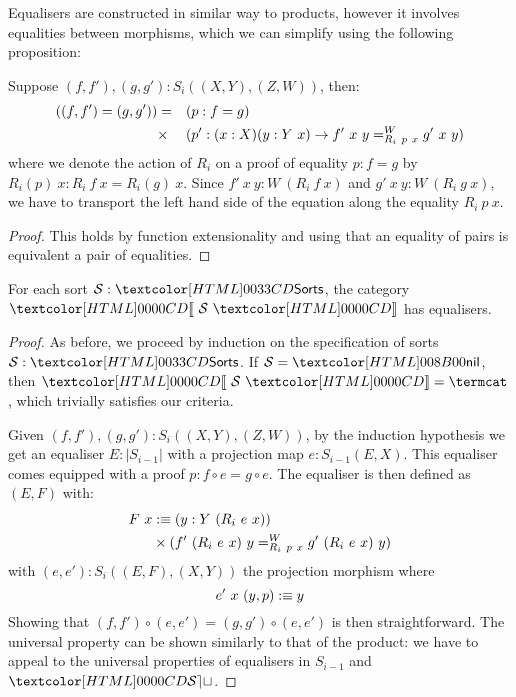 Equalisers are constructed in similar way to products, however it
involves equalities between morphisms, which we can simplify using the
following proposition:

\begin{proposition}
  Suppose $(f,f'), (g,g') : S_i((X,Y),(Z,W))$, then:
  \begin{align*}
    ((f,f') = (g,g')) &=& &(p : f = g) \\
                      &\times& &(p' : (x : X) (y : Y\ x) \to \pathover{W}{R_i\ p\ x}{f'\ x\ y}{g'\ x\ y})
  \end{align*}
  where we denote the action of $R_i$ on a proof of equality
  $p : f = g$ by $R_i(p)\ x : R_i\ f\ x = R_i(g)\ x$. Since
  $f'\ x\ y : W\ (R_i\ f\ x)$ and $g'\ x\ y : W\ (R_i\ g\ x)$, we have
  to transport the left hand side of the equation along the equality
  $R_i\ p\ x$.
\end{proposition}

\begin{proof}
  This holds by function extensionality and using that an equality of
  pairs is equivalent a pair of equalities.
\end{proof}
\begin{lemma}
\label{sorts-equalisers}
  For each sort $\Ss : \sortsty$, the category $\SortCat{\Ss}$ has
  equalisers.
\end{lemma}

\begin{proof}
  As before, we proceed by induction on the specification of sorts
  $\Ss : \sortsty$.  If $\Ss = \sortsnil$, then $\SortCat{\Ss} = \termcat$,
  which trivially satisfies our criteria.



  Given $(f,f'), (g,g') : S_i((X,Y),(Z,W))$, by the induction
  hypothesis we get an equaliser $E : |S_{i-1}|$ with a projection map
  $e : S_{i-1}(E,X)$. This equaliser comes equipped with a proof
  $p : f \circ e = g \circ e$. The equaliser is then defined as
  $(E,F)$ with:
  \begin{align*}
    F\ x & \ddefeq (y : Y\ (R_i\ e\ x)) \\
         & \times (\pathover{W}{R_i\ p\ x}{f'\ (R_i\ e\ x)\ y}{g'\ (R_i\ e\ x)\ y})
  \end{align*}
  with $(e,e') : S_i((E,F),(X,Y))$ the projection morphism where
  \[
    e'\ x\ (y , p) \ddefeq y
  \]
  Showing that $(f,f') \circ (e,e') = (g,g') \circ (e,e')$ is then
  straightforward. The universal property can be shown similarly to
  that of the product: we have to appeal to the universal properties
  of equalisers in $S_{i-1}$ and $\SET$.
\end{proof}

